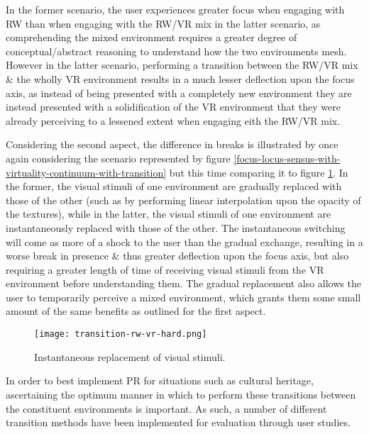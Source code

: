 In the former scenario, the user experiences greater focus when engaging with RW than when engaging with the RW/VR mix in the latter scenario, as comprehending the mixed environment requires a greater degree of conceptual/abstract reasoning to understand how the two environments mesh. However in the latter scenario, performing a transition between the RW/VR mix \& the wholly VR environment results in a much lesser deflection upon the focus axis, as instead of being presented with a completely new environment they are instead presented with a solidification of the VR environment that they were already perceiving to a lessened extent when engaging eith the RW/VR mix.

Considering the second aspect, the difference in breaks is illustrated by once again considering the scenario represented by figure \ref{focus-locus-sensus-with-virtuality-continuum-with-transition} but this time comparing it to figure \ref{transition-rw-vr-hard.png}. In the former, the visual stimuli of one environment are gradually replaced with those of the other (such as by performing linear interpolation upon the opacity of the textures), while in the latter, the visual stimuli of one environment are instantaneously replaced with those of the other. The instantaneous switching will come as more of a shock to the user than the gradual exchange, resulting in a worse break in presence \& thus greater deflection upon the focus axis, but also requiring a greater length of time of receiving visual stimuli from the VR environment before understanding them. The gradual replacement also allows the user to temporarily perceive a mixed environment, which grants them some small amount of the same benefits as outlined for the first aspect.

\begin{figure}[h]
	\begin{center}
		\texttt{[image: transition-rw-vr-hard.png]}
		\caption{Instantaneous replacement of visual stimuli.}
		\label{transition-rw-vr-hard.png}
	\end{center}
\end{figure}

In order to best implement PR for situations such as cultural heritage, ascertaining the optimum manner in which to perform these transitions between the constituent environments is important. As such, a number of different transition methods have been implemented for evaluation through user studies.

